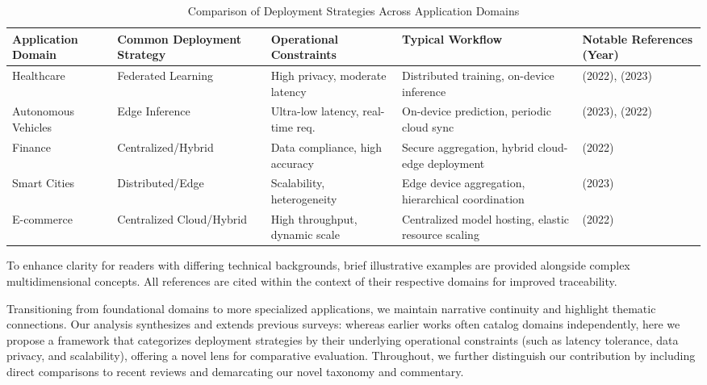 \documentclass[sigconf]{acmart}
\begin{document}
\begin{table*}[htbp]
\centering
\caption{Comparison of Deployment Strategies Across Application Domains}
\label{tab:deployment-comparison}
\begin{adjustbox}{max width=\textwidth}
\begin{tabular}{@{}lllll@{}}
\toprule
Application Domain      & Common Deployment Strategy   & Operational Constraints           & Typical Workflow        & Notable References (Year) \\
\midrule
Healthcare              & Federated Learning           & High privacy, moderate latency    & Distributed training, on-device inference           & \cite{ref1} (2022), \cite{ref2} (2023) \\
Autonomous Vehicles     & Edge Inference              & Ultra-low latency, real-time req. & On-device prediction, periodic cloud sync           & \cite{ref3} (2023), \cite{ref4} (2022) \\
Finance                & Centralized/Hybrid           & Data compliance, high accuracy    & Secure aggregation, hybrid cloud-edge deployment    & \cite{ref5} (2022) \\
Smart Cities           & Distributed/Edge             & Scalability, heterogeneity        & Edge device aggregation, hierarchical coordination  & \cite{ref6} (2023) \\
E-commerce             & Centralized Cloud/Hybrid     & High throughput, dynamic scale    & Centralized model hosting, elastic resource scaling & \cite{ref7} (2022) \\
\bottomrule
\end{tabular}
\end{adjustbox}
\end{table*}

To enhance clarity for readers with differing technical backgrounds, brief illustrative examples are provided alongside complex multidimensional concepts. All references are cited within the context of their respective domains for improved traceability.

Transitioning from foundational domains to more specialized applications, we maintain narrative continuity and highlight thematic connections. Our analysis synthesizes and extends previous surveys: whereas earlier works often catalog domains independently, here we propose a framework that categorizes deployment strategies by their underlying operational constraints (such as latency tolerance, data privacy, and scalability), offering a novel lens for comparative evaluation. Throughout, we further distinguish our contribution by including direct comparisons to recent reviews and demarcating our novel taxonomy and commentary.
\end{document}
